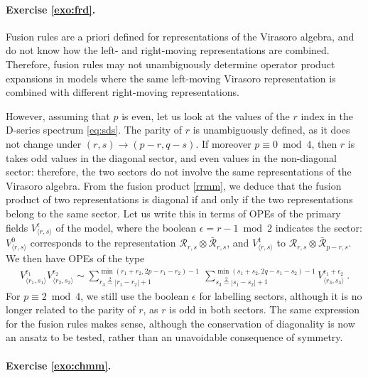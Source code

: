 \documentclass[12pt, a4paper]{article}
\theoremstyle{break}
\begin{document}
\paragraph{Exercise \ref{exo:frd}.}

Fusion rules are a priori defined for representations of the Virasoro algebra, and do not know how the left- and right-moving representations are combined. Therefore, fusion rules may not unambiguously determine operator product expansions in models where the same left-moving Virasoro representation is combined with different right-moving representations. 

However, assuming that $p$ is even, let us look at the values of the $r$ index in the D-series spectrum \eqref{eq:sds}. The parity of $r$ is unambiguously defined, as it does not change under $(r,s)\to (p-r,q-s)$. If moreover $p\equiv 0 \bmod 4$, then $r$ is takes odd values in the diagonal sector, and even values in the non-diagonal sector: therefore, the two sectors do not involve the same representations of the Virasoro algebra. From the fusion product \eqref{rrmm}, we deduce that the fusion product of two representations is diagonal if and only if the two representations belong to the same sector. Let us write this in terms of OPEs of the primary fields $V^\epsilon_{\langle r,s\rangle}$ of the model, where the boolean $\epsilon = r-1\bmod 2$ indicates the sector: $V^0_{\langle r,s\rangle}$ corresponds to the representation $\mathcal{R}_{ r,s} \otimes \bar{\mathcal{R}}_{r,s}$, and $V^1_{\langle r,s\rangle}$ to $\mathcal{R}_{r,s} \otimes \bar{\mathcal{R}}_{p-r,s}$. We then have OPEs of the type 
\begin{align}
 V^{\epsilon_1}_{\langle r_1,s_1\rangle}V^{\epsilon_2}_{\langle r_2,s_2\rangle} \sim \sum_{r_3\overset{2}{=}|r_1-r_2|+1}^{\min(r_1+r_2,2p-r_1-r_2)-1}\ \sum_{s_3\overset{2}{=}|s_1-s_2|+1}^{\min(s_1+s_2,2q-s_1-s_2)-1} V^{\epsilon_1+\epsilon_2}_{\langle r_3,s_3\rangle}\ .
\end{align}
For $p\equiv 2\bmod 4$, we still use the boolean $\epsilon$ for labelling sectors, although it is no longer related to the parity of $r$, as $r$ is odd in both sectors. The same expression for the fusion rules makes sense, although the conservation of diagonality is now an ansatz to be tested, rather than an unavoidable consequence of symmetry.

\paragraph{Exercise \ref{exo:chmm}.}
\end{document}
